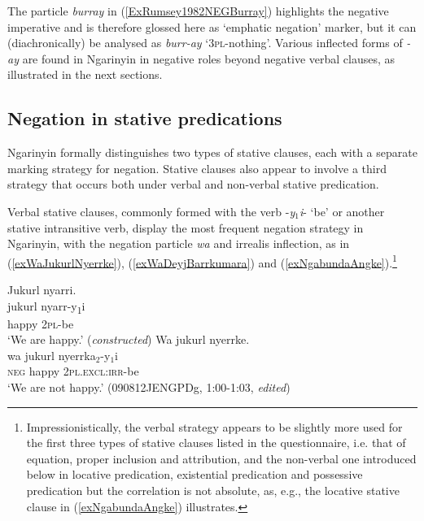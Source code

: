 \documentclass[output=paper,colorlinks,citecolor=brown]{langscibook}
\begin{document}
The particle \textit{burray} in (\ref{ExRumsey1982NEGBurray}) highlights the negative imperative and is therefore glossed here as `emphatic negation' marker, but it can (diachronically) be analysed as \textit{burr-ay} `3\textsc{pl}-nothing'. Various inflected forms of \textit{-ay} are found in Ngarinyin in negative roles beyond negative verbal clauses, as illustrated in the next sections.

\subsection{Negation in stative predications}

Ngarinyin formally distinguishes two types of stative clauses, each with a separate marking strategy for negation. Stative clauses also appear to involve a third strategy that occurs both under verbal and non-verbal stative predication.

Verbal stative clauses, commonly formed with the verb -\textit{\textit{y}}$_1$\textit{i}- `be' or another stative intransitive verb, display the most frequent negation strategy in Ngarinyin, with the negation particle \textit{wa} and irrealis inflection, as in (\ref{exWaJukurlNyerrke}), (\ref{exWaDeyjBarrkumara}) and (\ref{exNgabundaAngke}).\footnote{Impressionistically, the verbal strategy appears to be slightly more used for the first three types of stative clauses listed in the questionnaire, i.e. that of equation, proper inclusion and attribution, and the non-verbal one introduced below in locative predication, existential predication and possessive predication but the correlation is not absolute, as, e.g., the locative stative clause in (\ref{exNgabundaAngke}) illustrates.}

\begin{exe}
\ex \label{exWaJukurlNyerrke}
  \begin{xlist}
  \ex 
    \glll Jukurl nyarri. \\
        jukurl nyarr-y\textsubscript{1}i \\
        happy \textsc{2pl}-be \\
    \glt ‘We are happy.’ (\textit{constructed}) 
  \ex
    \glll Wa jukurl nyerrke.\\
    wa jukurl nyerrka$_2$-y$_1$i\\
    \textsc{neg} happy 2\textsc{pl.excl:irr}-be\\
    \trans `We are not happy.' (090812JENGPDg, 1:00-1:03, \textit{edited})
  \end{xlist}
\end{exe}
\end{document}
